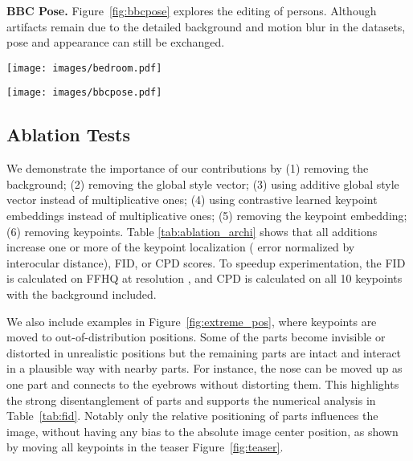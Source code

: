 \documentclass[10pt, conference, compsocconf]{IEEEtran}
\begin{document}
\textbf{BBC Pose.} Figure~\ref{fig:bbcpose} explores the editing of persons. Although artifacts remain due to the detailed background and motion blur in the datasets, pose and appearance can still be exchanged.   

\begin{figure*}[t]
\begin{center}
   \texttt{[image: images/bedroom.pdf]}
\end{center}
   \caption{\textbf{Editing on Bedroom} by (top-left) interpolating the keypoint embeddings of curtain and window and (top-right) moving bed and light; and (bottom) removing and adding objects}
\label{fig:bedroom}
\end{figure*}


\begin{figure*}[t]
\begin{center}
   \texttt{[image: images/bbcpose.pdf]}
\end{center}
   \caption{\textbf{Editing on BBC Pose.} The first row shows the source image and the second row the editing results. 
   \textbf{Left:} the human appearance is swapped with the small target image. 
   \textbf{Center:} changing the position to the one in the overlay. 
   \textbf{Right:} changing the background (inset shows the difference). 
   }
\label{fig:bbcpose}
\end{figure*}

\subsection{Ablation Tests}

We demonstrate the importance of our contributions by (1) removing the background; (2) removing the global style vector; (3) using additive global style vector instead of multiplicative ones; (4) using contrastive learned keypoint embeddings instead of multiplicative ones; (5) removing the keypoint embedding; (6) removing keypoints.  Table \ref{tab:ablation_archi} shows that all additions increase one or more of the keypoint localization (  error normalized by interocular distance), FID, or CPD scores. 
To speedup experimentation, the FID is calculated on FFHQ at resolution ,
and CPD is calculated on all 10 keypoints with the background included. 

We also include examples in Figure~\ref{fig:extreme_pos}, where keypoints are moved to out-of-distribution positions. Some of the parts become invisible or distorted in unrealistic positions but the remaining parts are intact and interact in a plausible way with nearby parts. For instance, the nose can be moved up as one part and connects to the eyebrows without distorting them. This highlights the strong disentanglement of parts and supports the numerical analysis in Table~\ref{tab:fid}. Notably only the relative positioning of parts influences the image, without having any bias to the absolute image center position, as shown by moving all keypoints in the teaser Figure~\ref{fig:teaser}.
\end{document}
